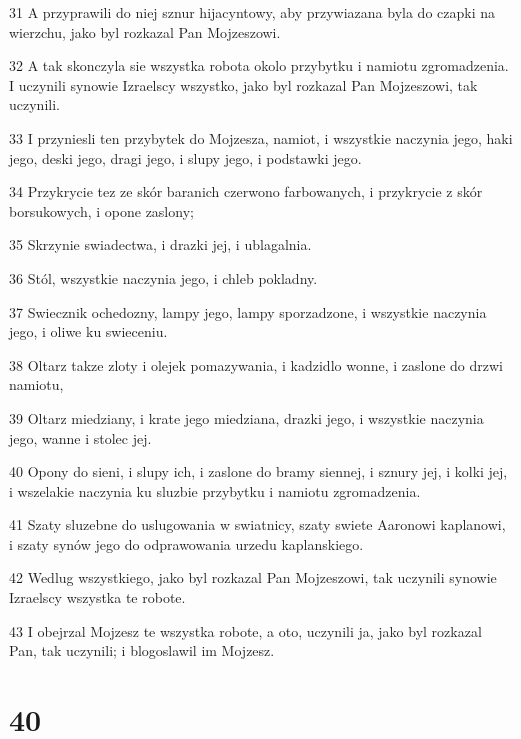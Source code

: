 \par 31 A przyprawili do niej sznur hijacyntowy, aby przywiazana byla do czapki na wierzchu, jako byl rozkazal Pan Mojzeszowi.
\par 32 A tak skonczyla sie wszystka robota okolo przybytku i namiotu zgromadzenia. I uczynili synowie Izraelscy wszystko, jako byl rozkazal Pan Mojzeszowi, tak uczynili.
\par 33 I przyniesli ten przybytek do Mojzesza, namiot, i wszystkie naczynia jego, haki jego, deski jego, dragi jego, i slupy jego, i podstawki jego.
\par 34 Przykrycie tez ze skór baranich czerwono farbowanych, i przykrycie z skór borsukowych, i opone zaslony;
\par 35 Skrzynie swiadectwa, i drazki jej, i ublagalnia.
\par 36 Stól, wszystkie naczynia jego, i chleb pokladny.
\par 37 Swiecznik ochedozny, lampy jego, lampy sporzadzone, i wszystkie naczynia jego, i oliwe ku swieceniu.
\par 38 Oltarz takze zloty i olejek pomazywania, i kadzidlo wonne, i zaslone do drzwi namiotu,
\par 39 Oltarz miedziany, i krate jego miedziana, drazki jego, i wszystkie naczynia jego, wanne i stolec jej.
\par 40 Opony do sieni, i slupy ich, i zaslone do bramy siennej, i sznury jej, i kolki jej, i wszelakie naczynia ku sluzbie przybytku i namiotu zgromadzenia.
\par 41 Szaty sluzebne do uslugowania w swiatnicy, szaty swiete Aaronowi kaplanowi, i szaty synów jego do odprawowania urzedu kaplanskiego.
\par 42 Wedlug wszystkiego, jako byl rozkazal Pan Mojzeszowi, tak uczynili synowie Izraelscy wszystka te robote.
\par 43 I obejrzal Mojzesz te wszystka robote, a oto, uczynili ja, jako byl rozkazal Pan, tak uczynili; i blogoslawil im Mojzesz.

\chapter{40}

